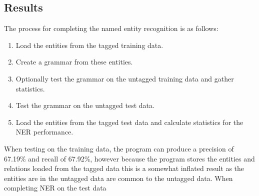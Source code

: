 \documentclass[draft]{article}
\begin{document}
\begin{multicols*}{2}
\section*{Results}
The process for completing the named entity recognition is as follows:
\begin{enumerate}
\item Load the entities from the tagged training data.
\item Create a grammar from these entities.
\item Optionally test the grammar on the untagged training data and gather statistics.
\item Test the grammar on the untagged test data.
\item Load the entities from the tagged test data and calculate statistics for the NER performance.
\end{enumerate}
When testing on the training data, the program can produce a precision of 67.19\% and recall of 67.92\%, however because the program stores the entities and relations loaded from the tagged data this is a somewhat inflated result as the entities are in the untagged data are common to the untagged data. When completing NER on the test data




\end{multicols*}
\end{document}
